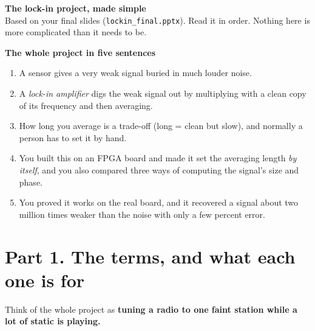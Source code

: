 \documentclass[11pt,a4paper]{article}
\begin{document}
{\Huge\bfseries\color{navy} The lock-in project, made simple}\\[3pt]
{\large Based on your final slides (\texttt{lockin\_final.pptx}). Read it in order. Nothing here is more complicated than it needs to be.}

\vspace{6pt}
\begin{tcolorbox}[colback=white,colframe=navy!50,boxrule=0.5pt,left=6pt,right=6pt]
\textbf{The whole project in five sentences}
\begin{enumerate}
\item A sensor gives a very weak signal buried in much louder noise.
\item A \emph{lock-in amplifier} digs the weak signal out by multiplying with a clean copy of its frequency and then averaging.
\item How long you average is a trade-off (long = clean but slow), and normally a person has to set it by hand.
\item You built this on an FPGA board and made it set the averaging length \emph{by itself}, and you also compared three ways of computing the signal's size and phase.
\item You proved it works on the real board, and it recovered a signal about two million times weaker than the noise with only a few percent error.
\end{enumerate}
\end{tcolorbox}

\section{Part 1. The terms, and what each one is for}
Think of the whole project as \textbf{tuning a radio to one faint station while a lot of static is playing.}
\end{document}
